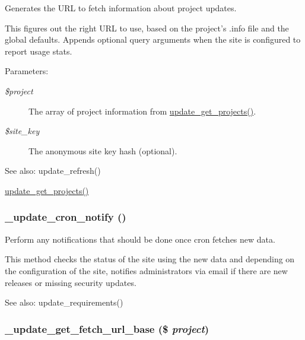 Generates the URL to fetch information about project updates.

This figures out the right URL to use, based on the project's .info file and the global defaults. Appends optional query arguments when the site is configured to report usage stats.

\begin{Desc}
\item[Parameters:]
\begin{description}
\item[{\em \$project}]The array of project information from \hyperlink{update_8compare_8inc_7e1ea49d91f2d2b81b8101d481d10300}{update\_\-get\_\-projects()}. \item[{\em \$site\_\-key}]The anonymous site key hash (optional).\end{description}
\end{Desc}
\begin{Desc}
\item[See also:]update\_\-refresh() 

\hyperlink{update_8compare_8inc_7e1ea49d91f2d2b81b8101d481d10300}{update\_\-get\_\-projects()} \end{Desc}
\hypertarget{update_8fetch_8inc_55d78e25faf69f49cfc88f2642c06f4e}{
\subsubsection[{\_\-update\_\-cron\_\-notify}]{\setlength{\rightskip}{0pt plus 5cm}\_\-update\_\-cron\_\-notify ()}}
\label{update_8fetch_8inc_55d78e25faf69f49cfc88f2642c06f4e}


Perform any notifications that should be done once cron fetches new data.

This method checks the status of the site using the new data and depending on the configuration of the site, notifies administrators via email if there are new releases or missing security updates.

\begin{Desc}
\item[See also:]update\_\-requirements() \end{Desc}
\hypertarget{update_8fetch_8inc_53552af8849428ac6faba273936eb00a}{
\subsubsection[{\_\-update\_\-get\_\-fetch\_\-url\_\-base}]{\setlength{\rightskip}{0pt plus 5cm}\_\-update\_\-get\_\-fetch\_\-url\_\-base (\$ {\em project})}}
\label{update_8fetch_8inc_53552af8849428ac6faba273936eb00a}


